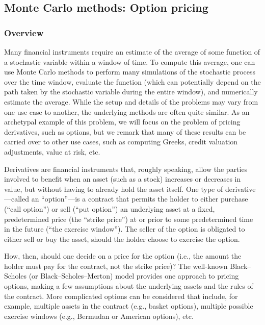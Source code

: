 \begin{refsection}

\subsection{Monte Carlo methods: Option pricing}\label{appl:OptionsPricing}

\subsubsection*{Overview}

Many financial instruments require an estimate of the average of some function of a stochastic variable within a window of time. To compute this average, one can use Monte Carlo methods to perform many simulations of the stochastic process over the time window, evaluate the function (which can potentially depend on the path taken by the stochastic variable during the entire window), and numerically estimate the average. 
While the setup and details of the problems may vary from one use case to another, the underlying methods are often quite similar. As an archetypal example of this problem, we will focus on the problem of pricing derivatives, such as options, but we remark that many of these results can be carried over to other use cases, such as computing Greeks, credit valuation adjustments, value at risk, etc.

Derivatives are financial instruments that, roughly speaking, allow the parties involved to benefit when an asset (such as a stock) increases or decreases in value, but without having to already hold the asset itself. One type of derivative---called an ``option''---is a contract that permits the holder to either purchase (``call option'') or sell (``put option'') an underlying asset at a fixed, predetermined price (the ``strike price'') at or prior to some predetermined time in the future (``the exercise window''). The seller of the option is obligated to either sell or buy the asset, should the holder choose to exercise the option.

How, then, should one decide on a price for the option (i.e., the amount the holder must pay for the contract, not the strike price)? The well-known Black--Scholes (or Black--Scholes--Merton) model provides one approach to pricing options, making a few assumptions about the underlying assets and the rules of the contract. More complicated options can be considered that include, for example, multiple assets  in the contract (e.g., basket options), multiple possible exercise windows (e.g., Bermudan or American options), etc.


\end{refsection}

